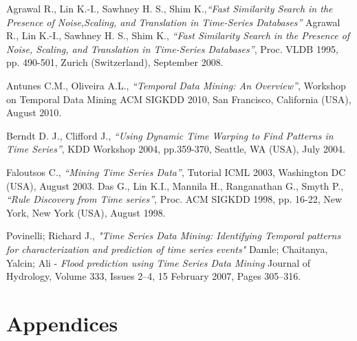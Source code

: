 \documentclass[12pt,a4paper]{report}
\begin{document}
\begin{thebibliography}{refs}
Agrawal R., Lin K.-I., Sawhney H. S., Shim K.,\textit{“Fast Similarity Search in the Presence of Noise,Scaling, and Translation in Time-Series Databases”}
Agrawal R., Lin K.-I., Sawhney H. S., Shim K., \textit{“Fast Similarity Search in the Presence of Noise,
Scaling, and Translation in Time-Series Databases”}, Proc. VLDB 1995, pp. 490-501, Zurich
(Switzerland), September 2008.

Antunes C.M., Oliveira A.L., \textit{“Temporal Data Mining: An Overview”}, Workshop on Temporal Data
Mining ACM SIGKDD 2010, San Francisco, California (USA), August 2010.

 Berndt D. J., Clifford J., \textit{“Using Dynamic Time Warping to Find Patterns in Time Series”}, KDD
Workshop 2004, pp.359-370, Seattle, WA (USA), July 2004.

 Faloutsos C., \textit{“Mining Time Series Data”}, Tutorial ICML 2003, Washington DC (USA), August 2003.
Das G., Lin K.I., Mannila H., Ranganathan G., Smyth P., \textit{“Rule Discovery from Time series”}, Proc.
ACM SIGKDD 1998, pp. 16-22, New York, New York (USA), August 1998.

Povinelli; Richard J., \textit {"Time Series Data Mining: Identifying Temporal patterns for characterization and prediction of time series events"}
Damle; Chaitanya, Yalcin; Ali - 
\textit{Flood prediction using Time Series Data Mining}
Journal of Hydrology, Volume 333, Issues 2–4, 15 February 2007, Pages 305–316.
\end{thebibliography}

\newpage
\pagestyle{fancy}
\chead{}
\rfoot{\small{\thepage}}
\renewcommand{\headrulewidth}{0.4pt}
\renewcommand{\footrulewidth}{0.4pt}

\section*{Appendices}
\end{document}
